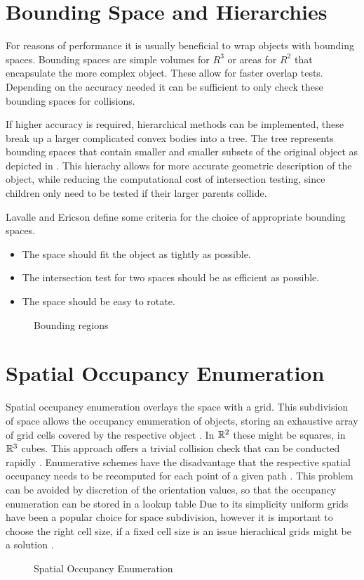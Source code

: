 \section{Bounding Space and Hierarchies}
For reasons of performance it is usually beneficial to wrap objects with bounding spaces. Bounding spaces are simple volumes for $R^3$ or areas for $R^2$ that encapsulate the more complex object. These allow for faster overlap tests. Depending on the accuracy needed it can be sufficient to only check these bounding spaces for collisions. \cite{LaValle.2006,Ericson.2005}

If higher accuracy is required, hierarchical methods can be implemented, these break up a larger complicated convex bodies into a tree. The tree represents bounding spaces that contain smaller and smaller subsets of the original object as depicted in . This hierachy allows for more accurate geometric description of the object, while reducing the computational cost of intersection testing, since children only need to be tested if their larger parents collide. \cite{LaValle.2006,Ericson.2005}

Lavalle and Ericson define some criteria for the choice of appropriate bounding spaces.

\begin{itemize}
	\item The space should fit the object as tightly as possible.
	\item The intersection test for two spaces should be as efficient as possible.
	\item The space should be easy to rotate.
\end{itemize}

\begin{figure}[h]
    \caption{Bounding regions}
    \label{fig:boundingRegions}
\end{figure}

\section{Spatial Occupancy Enumeration} \label{sec:spatialOccupancyEnumeration}
Spatial occupancy enumeration overlays the space with a grid. This subdivision of space allows the occupancy enumeration of objects, storing an exhaustive array of grid cells covered by the respective object \cite{Ericson.2005,Hayward.1986}. In $\mathbb{R}^2$ these might be squares, in $\mathbb{R}^3$ cubes. This approach offers a trivial collision check that can be conducted rapidly \cite{Ericson.2005,Hayward.1986}. Enumerative schemes have the disadvantage that the respective spatial occupancy needs to be recomputed for each point of a given path \cite{Hayward.1986}. This problem can be avoided by discretion of the orientation values, so that the occupancy enumeration can be stored in a lookup table \cite{Ziegler.2008} Due to its simplicity uniform grids have been a popular choice for space subdivision, however it is important to choose the right cell size, if a fixed cell size is an issue hierachical grids might be a solution \cite{Ericson.2005}.

\begin{figure}[h]
    \caption{Spatial Occupancy Enumeration}
    \label{fig:spatialOccupancyEnumeration}
\end{figure}